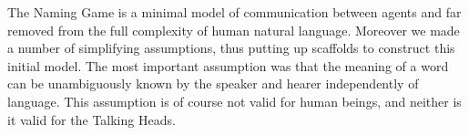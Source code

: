 The Naming Game is a minimal model of communication 
between agents and far removed from the full complexity 
of human natural language. Moreover we made a number of 
simplifying assumptions, thus putting up scaffolds to
construct this initial model. The most important assumption
was that the meaning of a word can be unambiguously 
known by the speaker and hearer independently of language. 
This assumption is of course not valid for human 
beings, and neither is it valid for the Talking Heads. 



